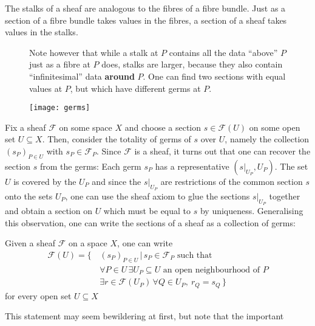 The stalks of a sheaf are analogous to the fibres of a fibre bundle.
Just as a section of a fibre bundle takes values in the fibres, a section of
a sheaf takes values in the stalks.
\begin{figure}[H]
  \centering
  \begin{minipage}{.5\textwidth}
    \centering
    \begin{lwarn}
      Note however that while a stalk at $P$ contains all the data ``above''
      $P$ just as a fibre at $P$ does, stalks are larger, because they also
      contain ``infinitesimal'' data \textbf{around} $P$. One can find two
      sections with equal values at $P$, but which have different germs at
      $P$.
    \end{lwarn}
  \end{minipage}%
  \begin{minipage}{.45\textwidth}
    \centering
    \texttt{[image: germs]}
  \end{minipage}
\end{figure}
Fix a sheaf $\mathscr{F}$ on some space $X$ and choose a section
$s\in \mathscr{F}(U)$ on some open set $U\subseteq X$. Then, consider
the totality of germs of $s$ over $U$, namely the collection
$(s_{P})_{P\in U}$ with $s_{P}\in\mathscr{F}_{P}$. Since $\mathscr{F}$ is a
sheaf, it turns out that one can recover the section $s$ from the
germs: Each germ $s_{P}$ has a representative $(s\vert_{U_{P}}, U_{P})$.
The set $U$ is covered by the $U_{P}$ and since the $s\vert_{U_{P}}$ are
restrictions of the common section $s$ onto the sets $U_{P}$, one can use the
sheaf axiom to glue the sections $s\vert_{U_{P}}$ together and obtain a
section on $U$ which must be equal to $s$ by uniqueness. Generalising this
observation, one can write the sections of a sheaf as a collection of germs:
\begin{lemm}\label{lemm:sheafify_sheaf}
  Given a sheaf $\mathscr{F}$ on a space $X$, one can write
  \begin{align*}
    \mathscr{F}(U)=\big\{\,
    & (s_{P})_{P\in U}\,\big\vert\, s_{P}\in\mathscr{F}_{P}\text{ such that} \\
    & \forall P\in U\,
      \exists U_{P}\subseteq U\text{ an open neighbourhood of }P \\
    & \exists r\in\mathscr{F}(U_{P})\,\forall Q\in U_{P},\ r_{Q}=s_{Q}\,\big\}
  \end{align*}
  for every open set $U\subseteq X$
\end{lemm}
This statement may seem bewildering at first, but note that the important
